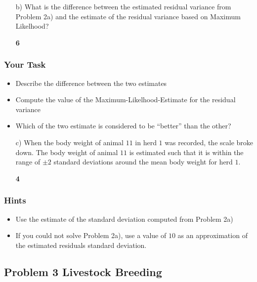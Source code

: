 \documentclass[]{article}
\providecommand{\tightlist}{%
  \setlength{\itemsep}{0pt}\setlength{\parskip}{0pt}}
\newcommand{\points}[1]
{\begin{flushright}\textbf{#1}\end{flushright}}
\begin{document}
\clearpage
\pagebreak

\begin{enumerate}
\item[b)] What is the difference between the estimated residual variance from Problem 2a) and the estimate of the residual variance based on Maximum Likelhood? 
\points{6}
\end{enumerate}

\subsubsection{Your Task}\label{your-task-1}

\begin{itemize}
\tightlist
\item
  Describe the difference between the two estimates
\item
  Compute the value of the Maximum-Likelhood-Estimate for the residual
  variance
\item
  Which of the two estimate is considered to be ``better'' than the
  other?
\end{itemize}

\clearpage
\pagebreak

\begin{enumerate}
\item[c)] When the body weight of animal $11$ in herd $1$ was recorded, the scale broke down.  The body weight of animal $11$ is estimated such that it is within the range of $\pm 2$ standard deviations around the mean body weight for herd $1$. 
\points{4}
\end{enumerate}

\subsubsection{Hints}\label{hints}

\begin{itemize}
\tightlist
\item
  Use the estimate of the standard deviation computed from Problem 2a)
\item
  If you could not solve Problem 2a), use a value of \(10\) as an
  approximation of the estimated residuals standard deviation.
\end{itemize}

\clearpage
\pagebreak

\subsection{Problem 3 Livestock
Breeding}\label{problem-3-livestock-breeding}
\end{document}
